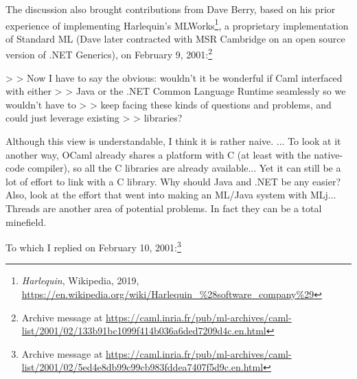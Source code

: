 \documentclass[acmsmall]{acmart}\settopmatter{}
\begin{document}
The discussion also brought contributions from Dave Berry, based on his prior experience of implementing
Harlequin’s MLWorks\footnote{\textit{Harlequin}, Wikipedia, 2019, \url{https://en.wikipedia.org/wiki/Harlequin_\%28software_company\%29}}, a proprietary
implementation of Standard ML (Dave later contracted with MSR Cambridge on an open source version of .NET Generics), on February
9, 2001:\footnote{Archive message at \url{https://caml.inria.fr/pub/ml-archives/caml-list/2001/02/133b91bc1099f414b036a6ded7209d4c.en.html}}
\begin{verbquote}
> > Now I have to say the obvious: wouldn't it be wonderful if Caml interfaced with either 
> > Java or the .NET Common Language Runtime seamlessly so we wouldn't have to 
> > keep facing these kinds of questions and problems, and could just leverage existing 
> > libraries?   

Although this view is understandable, I think it is rather naive. ... To look at it another way, OCaml already shares a platform with C (at least with the native-code compiler), so all the C libraries are already available... Yet it can still be a lot of effort to link with a C library.  Why should Java and .NET be any easier?  Also, look at the effort that went into making an ML/Java system with MLj... Threads are another area of potential problems.  In fact they can be a total minefield.
\end{verbquote}
To which I replied on February 10, 2001:\footnote{Archive message at \url{https://caml.inria.fr/pub/ml-archives/caml-list/2001/02/5ed4e8db99c99cb983fddea7407f5d9c.en.html}}
\end{document}

